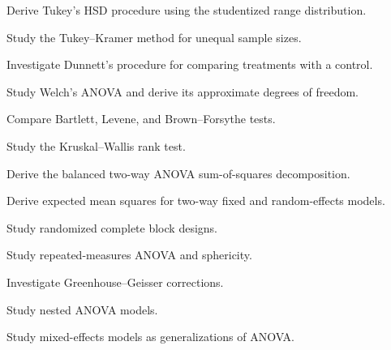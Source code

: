 \begin{exercise}[4]
Derive Tukey's HSD procedure using the studentized range distribution.
\end{exercise}

\begin{exercise}[4]
Study the Tukey--Kramer method for unequal sample sizes.
\end{exercise}

\begin{exercise}[4]
Investigate Dunnett's procedure for comparing treatments with a control.
\end{exercise}

\begin{exercise}[4]
Study Welch's ANOVA and derive its approximate degrees of freedom.
\end{exercise}

\begin{exercise}[4]
Compare Bartlett, Levene, and Brown--Forsythe tests.
\end{exercise}

\begin{exercise}[4]
Study the Kruskal--Wallis rank test.
\end{exercise}

\begin{exercise}[4]
Derive the balanced two-way ANOVA sum-of-squares decomposition.
\end{exercise}

\begin{exercise}[4]
Derive expected mean squares for two-way fixed and random-effects models.
\end{exercise}

\begin{exercise}[4]
Study randomized complete block designs.
\end{exercise}

\begin{exercise}[4]
Study repeated-measures ANOVA and sphericity.
\end{exercise}

\begin{exercise}[4]
Investigate Greenhouse--Geisser corrections.
\end{exercise}

\begin{exercise}[4]
Study nested ANOVA models.
\end{exercise}

\begin{exercise}[4]
Study mixed-effects models as generalizations of ANOVA.
\end{exercise}

